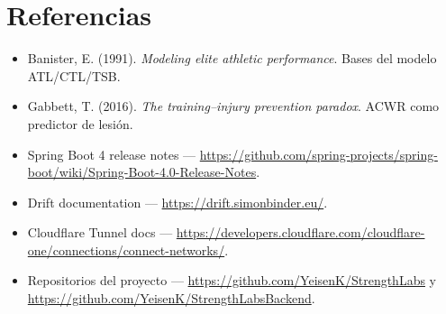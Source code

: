 \documentclass[11pt,a4paper]{article}
\begin{document}
\section{Referencias}

\begin{itemize}[leftmargin=*]
  \item Banister, E. (1991). \textit{Modeling elite athletic performance}. Bases del modelo ATL/CTL/TSB.
  \item Gabbett, T. (2016). \textit{The training–injury prevention paradox}. ACWR como predictor de lesión.
  \item Spring Boot 4 release notes — \url{https://github.com/spring-projects/spring-boot/wiki/Spring-Boot-4.0-Release-Notes}.
  \item Drift documentation — \url{https://drift.simonbinder.eu/}.
  \item Cloudflare Tunnel docs — \url{https://developers.cloudflare.com/cloudflare-one/connections/connect-networks/}.
  \item Repositorios del proyecto — \url{https://github.com/YeisenK/StrengthLabs} y \url{https://github.com/YeisenK/StrengthLabsBackend}.
\end{itemize}
\end{document}
